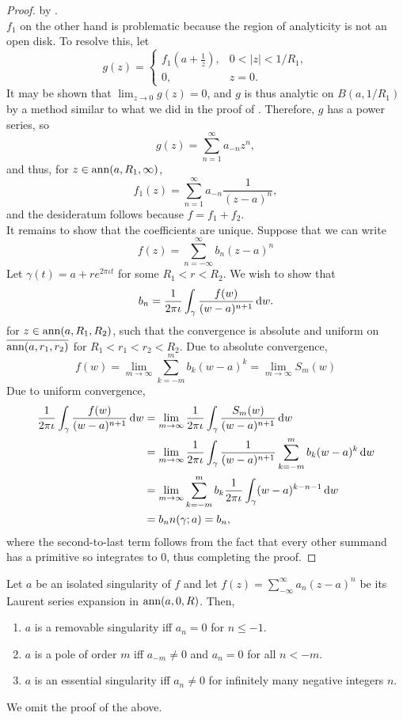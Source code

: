 \begin{proof}
		by .\\
		$f_1$ on the other hand is problematic because the region of analyticity is not an open disk. To resolve this, let
		\[ g(z) = \begin{cases} f_1(a+\frac{1}{z}), & 0 < |z| < 1/R_1, \\ 0, & z = 0. \end{cases} \]
		It may be shown that $\lim_{z\to 0} g(z) = 0$, and $g$ is thus analytic on $B(a,1/R_1)$ by a method similar to what we did in the proof of . Therefore, $g$ has a power series, so
		\[ g(z) = \sum_{n=1}^{\infty} a_{-n} z^n, \]
		and thus, for $z \in \operatorname{ann}(a,R_1,\infty)$,
		\[ f_1(z) = \sum_{n=1}^{\infty} a_{-n} \frac{1}{(z-a)^n}, \]
		and the desideratum follows because $f = f_1 + f_2$.\\

		It remains to show that the coefficients are unique. Suppose that we can write
		\[ f(z) = \sum_{n=-\infty}^{\infty} b_n (z-a)^n \]
		Let $\gamma(t) = a+re^{2\pi\iota t}$ for some $R_1 < r < R_2$. We wish to show that
		\[ b_n = \frac{1}{2\pi\iota} \int_{\gamma} \frac{f(w)}{(w-a)^{n+1}} \dif w. \]
		for $z \in \operatorname{ann}(a,R_1,R_2)$, such that the convergence is absolute and uniform on $\overline{\operatorname{ann}(a,r_1,r_2)}$ for $R_1 < r_1 < r_2 < R_2$. Due to absolute convergence,
		\[ f(w) = \lim_{m\to\infty} \sum_{k=-m}^m b_k (w-a)^k = \lim_{m\to\infty} S_m(w)  \]
		Due to uniform convergence,
		\begin{align*}
			\frac{1}{2\pi\iota} \int_{\gamma} \frac{f(w)}{(w-a)^{n+1}} \dif w &= \lim_{m\to\infty} \frac{1}{2\pi\iota} \int_{\gamma} \frac{S_m(w)}{(w-a)^{n+1}} \dif w \\
				&= \lim_{m\to\infty} \frac{1}{2\pi\iota} \int_{\gamma} \frac{1}{(w-a)^{n+1}} \sum_{k=-m}^m b_k (w-a)^k \dif w \\
				&= \lim_{m\to\infty} \sum_{k=-m}^m b_k \frac{1}{2\pi\iota} \int_{\gamma}(w-a)^{k-n-1} \dif w \\
				&= b_n n(\gamma;a) = b_n,
		\end{align*}
		where the second-to-last term follows from the fact that every other summand has a primitive so integrates to $0$, thus completing the proof.
	\end{proof}

	\begin{corollary}
		Let $a$ be an isolated singularity of $f$ and let $f(z) = \sum_{-\infty}^{\infty} a_n (z-a)^n$ be its Laurent series expansion in $\operatorname{ann}(a,0,R)$. Then,
		\begin{enumerate}[label=(\alph*)]
			\item $a$ is a removable singularity iff $a_n = 0$ for $n \le -1$.
			\item $a$ is a pole of order $m$ iff $a_{-m} \ne 0$ and $a_n = 0$ for all $n < -m$.
			\item $a$ is an essential singularity iff $a_n \ne 0$ for infinitely many negative integers $n$.
		\end{enumerate}
	\end{corollary}
	We omit the proof of the above.

